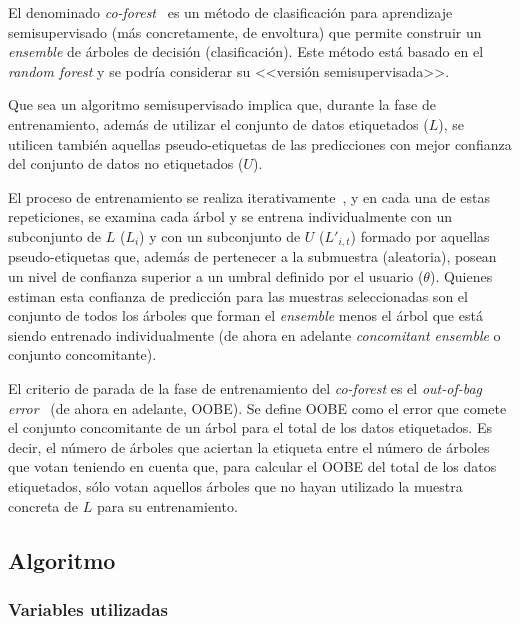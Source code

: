 El denominado \textit{co-forest}~\cite{originalCoForest2007} es un método de clasificación para aprendizaje semisupervisado (más concretamente, de envoltura) que permite construir un \textit{ensemble} de árboles de decisión (clasificación). Este método está basado en el \textit{random forest} y se podría considerar su <<versión semisupervisada>>. 

Que sea un algoritmo semisupervisado implica que, durante la fase de entrenamiento, además de utilizar el conjunto de datos etiquetados ($L$), se utilicen también aquellas pseudo-etiquetas de las predicciones con mejor confianza del conjunto de datos no etiquetados ($U$).

El proceso de entrenamiento se realiza iterativamente~\cite{engelen2018thesis}, y en cada una de estas repeticiones, se examina cada árbol y se entrena individualmente con un subconjunto de $L$ ($L_{i}$) y con un subconjunto de $U$ ($L'_{i,t}$) formado por aquellas pseudo-etiquetas que, además de pertenecer a la submuestra (aleatoria), posean un nivel de confianza superior a un umbral definido por el usuario ($\theta$). Quienes estiman esta confianza de predicción para las muestras seleccionadas son el conjunto de todos los árboles que forman el \textit{ensemble} menos el árbol que está siendo entrenado individualmente (de ahora en adelante \textit{concomitant ensemble} o conjunto concomitante).

El criterio de parada de la fase de entrenamiento del \textit{co-forest} es el \textit{out-of-bag error}~\cite{zhou2021SemisupervisedRecommendationAttack} (de ahora en adelante, OOBE). Se define OOBE como el error que comete el conjunto concomitante de un árbol para el total de los datos etiquetados. Es decir, el número de árboles que aciertan la etiqueta entre el número de árboles que votan teniendo en cuenta que, para calcular el OOBE del total de los datos etiquetados, sólo votan aquellos árboles que no hayan utilizado la muestra concreta de $L$ para su entrenamiento.


\subsection{Algoritmo}


\subsubsection{Variables utilizadas}

